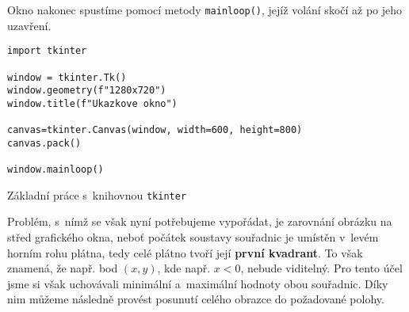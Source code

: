 Okno nakonec spustíme pomocí metody \texttt{mainloop()}, jejíž volání skočí až po jeho uzavření.
\begin{program}[h]
\begin{lstlisting}[style=python]
import tkinter

window = tkinter.Tk()
window.geometry(f"1280x720")
window.title(f"Ukazkove okno")

canvas=tkinter.Canvas(window, width=600, height=800)
canvas.pack()

window.mainloop()
\end{lstlisting}
    \caption{Základní práce s~knihovnou \texttt{tkinter}}
    \label{prog:tkinter-zaklad}
\end{program}

Problém, s~nímž se však nyní potřebujeme vypořádat, je zarovnání obrázku na střed grafického okna, neboť počátek soustavy souřadnic je umístěn v~levém horním rohu plátna, tedy celé plátno tvoří její \textbf{první kvadrant}. To však znamená, že např. bod $(x,y)$, kde např. $x<0$, nebude viditelný. Pro tento účel jsme si však uchovávali minimální a~maximální hodnoty obou souřadnic. Díky nim můžeme následně provést posunutí celého obrazce do požadované polohy.

